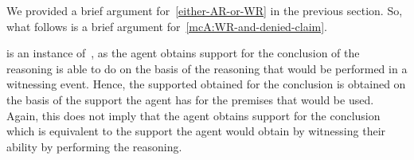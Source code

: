 \begin{note}[To argument]
  {
    \color{red}
    We provided a brief argument for~\ref{either-AR-or-WR} in the previous section.
  }
  So, what follows is a brief argument for~\ref{mcA:WR-and-denied-claim}.
\end{note}

\begin{note}[Attribute]
  \WR{} is an instance of~\EAS{}, as the agent obtains support for the conclusion of the reasoning is able to do on the basis of the reasoning that would be performed in a witnessing event.
  Hence, the supported obtained for the conclusion is obtained on the basis of the support the agent has for the premises that would be used.
  Again, this does not imply that the agent obtains support for the conclusion which is equivalent to the support the agent would obtain by witnessing their ability by performing the reasoning.
\end{note}

